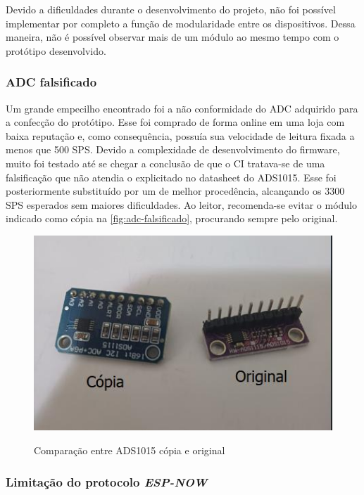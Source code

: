 Devido a dificuldades durante o desenvolvimento do projeto, não foi possível implementar por completo a função de modularidade entre os dispositivos. Dessa maneira, não é possível observar mais de um módulo ao mesmo tempo com o protótipo desenvolvido.

\subsubsection{ADC falsificado}\label{adc-falso}

Um grande empecilho encontrado foi a não conformidade do \gls{ADC} adquirido para a confecção do protótipo. Esse foi comprado de forma online em uma loja com baixa reputação e, como consequência, possuía sua velocidade de leitura fixada a menos que 500 \gls{SPS}. Devido a complexidade de desenvolvimento do firmware, muito foi testado até se chegar a conclusão de que o CI tratava-se de uma falsificação que não atendia o explicitado no datasheet do ADS1015. Esse foi posteriormente substituído por um de melhor procedência, alcançando os 3300 \gls{SPS} esperados sem maiores dificuldades.
Ao leitor, recomenda-se evitar o módulo indicado como cópia na \autoref{fig:adc-falsificado}, procurando sempre pelo original.

\begin{figure}[h!]
    \centering
    \caption{Comparação entre ADS1015 cópia e original}
    \includegraphics[width=\textwidth, height=\textheight, keepaspectratio]{figuras/adc-fake-comparison.jpeg}
    \label{fig:adc-falsificado}
    \fonte{}
\end{figure}

\subsubsection{Limitação do protocolo \textit{ESP-NOW}}\label{limit-espnow}


